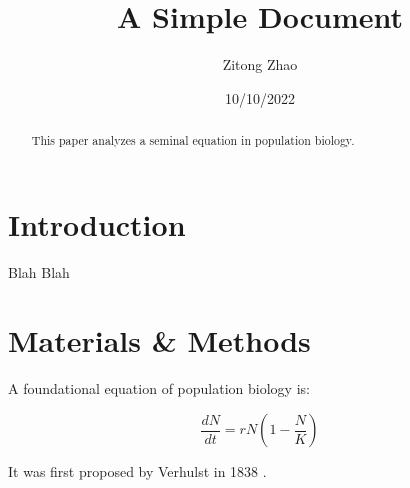 \documentclass[12pt]{article}
\title{A Simple Document}
\author{Zitong Zhao}
\date{10/10/2022}
\begin{document}
  \maketitle
  
  \begin{abstract}
    This paper analyzes a seminal equation in population biology.
  \end{abstract}
  
  \section{Introduction}
    Blah Blah
  
  \section{Materials \& Methods}
  
  A foundational equation of population biology is:
  
  \begin{equation}
    \frac{dN}{dt} = r N (1 - \frac{N}{K})
  \end{equation}
  
  It was first proposed by Verhulst in 1838 \cite{verhulst1838notice}.
  
  
  
  
\end{document}
